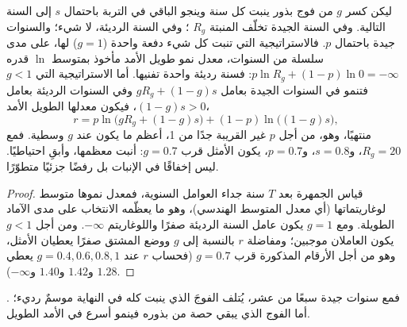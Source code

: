 \begin{theorem}\label{thm:b2:plant-flowering:bet}
ليكن كسر $g$ من فوج بذور ينبت كل سنة وينجو
الباقي في التربة باحتمال $s$ إلى السنة التالية. وفي
السنة الجيدة تخلّف  المنبتة $R_g$ ؛ وفي السنة الرديئة،
لا شيء؛ والسنوات جيدة باحتمال $p$. فالاستراتيجية التي
تنبت كل شيء دفعة واحدة ($g = 1$) لها، على مدى سلسلة من السنوات،
معدل نمو طويل الأمد مأخوذ بمتوسط $\ln$ قدره $p\ln R_g + (1 - p)\ln 0 =
-\infty$: فسنة رديئة واحدة تفنيها. أما الاستراتيجية التي $g < 1$
فتنمو في السنوات الجيدة بعامل $gR_g + (1 - g)s$ وفي السنوات الرديئة
بعامل $(1 - g)s > 0$، فيكون معدلها الطويل الأمد،
\[
r = p\ln\bigl(gR_g + (1 - g)s\bigr) + (1 - p)\ln\bigl((1 - g)s\bigr),
\]
منتهيًا، وهو، من أجل $p$ غير القريبة جدًا من 1، أعظم ما يكون عند
$g$ وسطية. فمع $R_g = 20$، و$s = 0.8$، و$p = 0.7$، يكون
الأمثل قرب $g = 0.7$: أنبت معظمها، وأبقِ احتياطيًا.
 ليس إخفاقًا في الإنبات بل رفضًا جزئيًا
متطوّرًا.
\end{theorem}
\begin{proof}
قياس الجمهرة بعد $T$ سنة جداء العوامل السنوية،
فمعدل نموها متوسط لوغاريتماتها
(أي معدل المتوسط الهندسي)، وهو ما يعظّمه الانتخاب على مدى
الآماد الطويلة. ومع $g = 1$ يكون عامل السنة الرديئة صفرًا واللوغاريتم
$-\infty$. ومن أجل $g < 1$ يكون العاملان موجبين؛ ومفاضلة
$r$ بالنسبة إلى $g$ ووضع المشتق صفرًا يعطيان
الأمثل، وهو من أجل الأرقام المذكورة قرب $g = 0.7$
(فحساب $r$ عند $g = 0.4, 0.6, 0.8, 1$ يعطي $1.28$ و$1.42$
و$1.40$ و$-\infty$).
\end{proof}

\begin{omfigure}

{\small {} . فمع سنوات جيدة سبعًا من عشر،
يُتلف الفوجَ الذي ينبت كله في النهاية موسمٌ
رديء؛ أما الفوج الذي يبقي حصة من بذوره فينمو أسرع في
الأمد الطويل.}
\end{omfigure}

